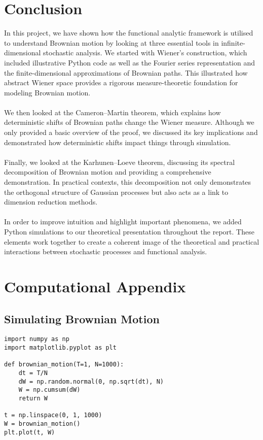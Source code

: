 \documentclass[12pt]{report}
\begin{document}
\chapter{Conclusion}

In this project, we have shown how the functional analytic framework is utilised to understand Brownian motion by looking at three essential tools in infinite-dimensional stochastic analysis. We started with Wiener's construction, which included illustrative Python code as well as the Fourier series representation and the finite-dimensional approximations of Brownian paths. This illustrated how abstract Wiener space provides a rigorous measure-theoretic foundation for modeling Brownian motion.\\
\\
\noindent
We then looked at the Cameron–Martin theorem, which explains how deterministic shifts of Brownian paths change the Wiener measure. Although we only provided a basic overview of the proof, we discussed its key implications and demonstrated how deterministic shifts impact things through simulation.\\
\\
\noindent
Finally, we looked at the Karhunen–Loeve theorem, discussing its spectral decomposition of Brownian motion and providing a comprehensive demonstration. In practical contexts, this decomposition not only demonstrates the orthogonal structure of Gaussian processes but also acts as a link to dimension reduction methods.\\
\\
\noindent
In order to improve intuition and highlight important phenomena, we added Python simulations to our theoretical presentation throughout the report. These elements work together to create a coherent image of the theoretical and practical interactions between stochastic processes and functional analysis.


\appendix
\chapter{Computational Appendix}
\section{Simulating Brownian Motion}
\begin{verbatim}
import numpy as np
import matplotlib.pyplot as plt

def brownian_motion(T=1, N=1000):
    dt = T/N
    dW = np.random.normal(0, np.sqrt(dt), N)
    W = np.cumsum(dW)
    return W

t = np.linspace(0, 1, 1000)
W = brownian_motion()
plt.plot(t, W)
\end{verbatim}
\end{document}
